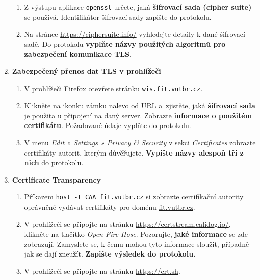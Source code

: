 \documentclass[a4paper,11pt]{article}
\begin{document}
\begin{enumerate}
\begin{enumerate}
      \item Z výstupu aplikace \texttt{openssl} určete, jaká \textbf{šifrovací sada (cipher suite)} se používá.
      Identifikátor šifrovací sady zapište do protokolu.

      \item Na stránce \url{https://ciphersuite.info/} vyhledejte detaily k dané šifrovací sadě. Do protokolu \textbf{vyplňte názvy použitých algoritmů pro zabezpečení komunikace TLS}.
    \end{enumerate}

  \item {\bf Zabezpečený přenos dat TLS v prohlížeči}

    \begin{enumerate}


      \item V prohlížeči Firefox otevřete stránku  \verb|wis.fit.vutbr.cz|.

      \item Klikněte na ikonku zámku nalevo od URL a~zjistěte, jaká \textbf{šifrovací
      sada} je použita u připojení na daný server. Zobrazte \textbf{informace o použitém certifikátu}.
      Požadované údaje vyplňte do protokolu.

      \item V menu \emph{Edit » Settings » Privacy \& Security} v sekci
        \emph{Certificates} zobrazte certifikáty autorit, kterým důvěřujete. {\bf Vypište názvy alespoň tří z nich} do protokolu.


    \end{enumerate}

  \item {\bf Certificate Transparency}

    \begin{enumerate}

      \item Příkazem \verb|host -t CAA fit.vutbr.cz| si zobrazte certifikační
        autority oprávněné vydávat certifikáty pro doménu \url{fit.vutbr.cz}.

      \item V prohlížeči se připojte na stránku
        \url{https://certstream.calidog.io/}, klikněte na tlačítko \emph{Open
        Fire Hose}. Pozorujte, \textbf{jaké informace} se zde zobrazují.
        Zamyslete se, k čemu mohou tyto informace sloužit, případně jak se dají zneužít. {\bf Zapište výsledek do protokolu.}
      \item V prohlížeči se připojte na stránku \url{https://crt.sh}.


\end{enumerate}
\end{enumerate}
\end{document}
